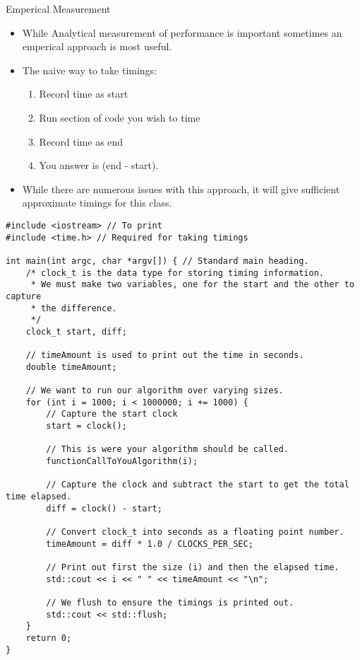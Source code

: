 \documentclass{beamer}
\begin{document}
\begin{frame}{Emperical Measurement}
\begin{itemize}
\item While Analytical measurement of performance is important sometimes an emperical approach is most useful.
\item The naive way to take timings:
\begin{enumerate}
\item Record time as start
\item Run section of code you wish to time
\item Record time as end
\item You answer is (end - start).
\end{enumerate}
\item While there are numerous issues with this approach, it will give sufficient approximate timings for this class.
\end{itemize}
\end{frame}

\begin{frame}[fragile]{}
\begin{lstlisting}
#include <iostream> // To print
#include <time.h> // Required for taking timings

int main(int argc, char *argv[]) { // Standard main heading.
    /* clock_t is the data type for storing timing information.
     * We must make two variables, one for the start and the other to capture
     * the difference.
     */
    clock_t start, diff;

    // timeAmount is used to print out the time in seconds.
    double timeAmount;

    // We want to run our algorithm over varying sizes.
    for (int i = 1000; i < 1000000; i += 1000) {
        // Capture the start clock
        start = clock();

        // This is were your algorithm should be called.
        functionCallToYouAlgorithm(i);

        // Capture the clock and subtract the start to get the total time elapsed.
        diff = clock() - start;

        // Convert clock_t into seconds as a floating point number.
        timeAmount = diff * 1.0 / CLOCKS_PER_SEC;

        // Print out first the size (i) and then the elapsed time.
        std::cout << i << " " << timeAmount << "\n";

        // We flush to ensure the timings is printed out.
        std::cout << std::flush;
    }
    return 0;
}

\end{lstlisting}
\end{frame}
\end{document}
